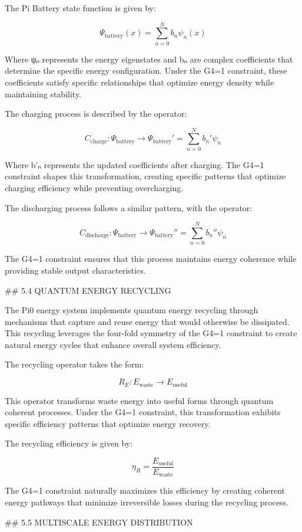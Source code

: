 The Pi Battery state function is given by:

$$\Psi_{\text{battery}}(x) = \sum_{n=0}^{N} b_n \psi_n(x)$$

Where ψₙ represents the energy eigenstates and bₙ are complex coefficients that determine the specific energy configuration. Under the G4=1 constraint, these coefficients satisfy specific relationships that optimize energy density while maintaining stability.

The charging process is described by the operator:

$$C_{\text{charge}}: \Psi_{\text{battery}} \rightarrow \Psi_{\text{battery}}' = \sum_{n=0}^{N} b_n' \psi_n$$

Where b'ₙ represents the updated coefficients after charging. The G4=1 constraint shapes this transformation, creating specific patterns that optimize charging efficiency while preventing overcharging.

The discharging process follows a similar pattern, with the operator:

$$C_{\text{discharge}}: \Psi_{\text{battery}} \rightarrow \Psi_{\text{battery}}'' = \sum_{n=0}^{N} b_n'' \psi_n$$

The G4=1 constraint ensures that this process maintains energy coherence while providing stable output characteristics.

## 5.4 QUANTUM ENERGY RECYCLING

The Pi0 energy system implements quantum energy recycling through mechanisms that capture and reuse energy that would otherwise be dissipated. This recycling leverages the four-fold symmetry of the G4=1 constraint to create natural energy cycles that enhance overall system efficiency.

The recycling operator takes the form:

$$R_E: E_{\text{waste}} \rightarrow E_{\text{useful}}$$

This operator transforms waste energy into useful forms through quantum coherent processes. Under the G4=1 constraint, this transformation exhibits specific efficiency patterns that optimize energy recovery.

The recycling efficiency is given by:

$$\eta_R = \frac{E_{\text{useful}}}{E_{\text{waste}}}$$

The G4=1 constraint naturally maximizes this efficiency by creating coherent energy pathways that minimize irreversible losses during the recycling process.

## 5.5 MULTISCALE ENERGY DISTRIBUTION

